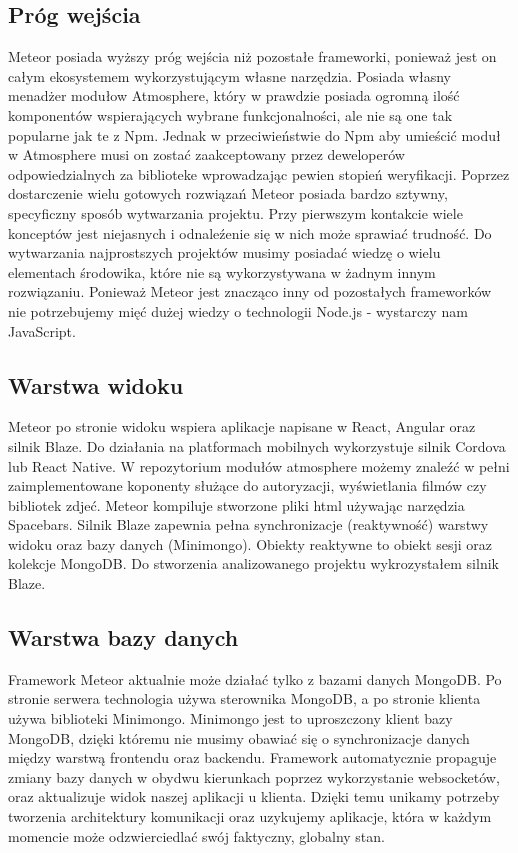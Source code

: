 \documentclass[12pt]{report}
\begin{document}
    \subsection{Próg wejścia}
      Meteor posiada wyższy próg wejścia niż pozostałe frameworki, ponieważ jest on całym ekosystemem wykorzystującym własne narzędzia.
      Posiada własny menadżer modułow Atmosphere, który w prawdzie posiada ogromną ilość komponentów wspierających wybrane funkcjonalności, ale nie są one tak popularne jak te z Npm.
      Jednak w przeciwieństwie do Npm aby umieścić moduł w Atmosphere musi on zostać zaakceptowany przez deweloperów odpowiedzialnych za biblioteke wprowadzając pewien stopień weryfikacji.
      Poprzez dostarczenie wielu gotowych rozwiązań Meteor posiada bardzo sztywny, specyficzny sposób wytwarzania projektu.
      Przy pierwszym kontakcie wiele konceptów jest niejasnych i odnaleźenie się w nich może sprawiać trudność. 
      Do wytwarzania najprostszych projektów musimy posiadać wiedzę o wielu elementach środowika, które nie są wykorzystywana w żadnym innym rozwiązaniu.
      Ponieważ Meteor jest znacząco inny od pozostałych frameworków nie potrzebujemy mięć dużej wiedzy o technologii Node.js - wystarczy nam JavaScript.

    \subsection{Warstwa widoku}
      Meteor po stronie widoku wspiera aplikacje napisane w React, Angular oraz silnik Blaze.
      Do działania na platformach mobilnych wykorzystuje silnik Cordova lub React Native.
      W repozytorium modułów atmosphere możemy znaleźć w pełni zaimplementowane koponenty służące do autoryzacji, wyświetlania filmów czy bibliotek zdjeć.
      Meteor kompiluje stworzone pliki html używając narzędzia Spacebars.
      Silnik Blaze zapewnia pełna synchronizacje (reaktywność) warstwy widoku oraz bazy danych (Minimongo).
      Obiekty reaktywne to obiekt sesji oraz kolekcje MongoDB.
      Do stworzenia analizowanego projektu wykrozystałem silnik Blaze.

    \subsection{Warstwa bazy danych}
      Framework Meteor aktualnie może działać tylko z bazami danych MongoDB.
      Po stronie serwera technologia używa sterownika MongoDB, a po stronie klienta używa biblioteki Minimongo.
      Minimongo jest to uproszczony klient bazy MongoDB, dzięki któremu nie musimy obawiać się o synchronizacje danych między warstwą frontendu oraz backendu.
      Framework automatycznie propaguje zmiany bazy danych w obydwu kierunkach poprzez wykorzystanie websocketów, oraz aktualizuje widok naszej aplikacji u klienta.
      Dzięki temu unikamy potrzeby tworzenia architektury komunikacji oraz uzykujemy aplikacje, która w każdym momencie może odzwierciedlać swój faktyczny, globalny stan.
    
\end{document}
